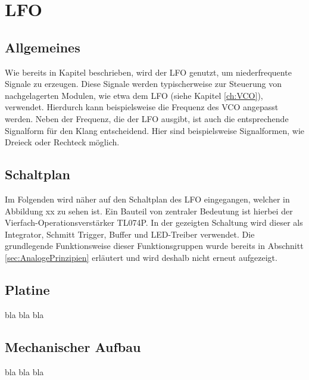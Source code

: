 \chapter{LFO}
\label{ch:LFO}

\section{Allgemeines}
Wie bereits in Kapitel \label{ch:concept} beschrieben, wird der LFO genutzt, um niederfrequente Signale zu erzeugen. 
Diese Signale werden typischerweise zur Steuerung von nachgelagerten Modulen, wie etwa dem LFO (siehe Kapitel \ref{ch:VCO}), verwendet.
Hierdurch kann beispielsweise die Frequenz des VCO angepasst werden. 
Neben der Frequenz, die der LFO ausgibt, ist auch die entsprechende Signalform für den Klang entscheidend. Hier sind beispielsweise Signalformen, wie Dreieck oder Rechteck möglich.

\section{Schaltplan}
Im Folgenden wird näher auf den Schaltplan des LFO eingegangen, welcher in Abbildung xx zu sehen ist. 
Ein Bauteil von zentraler Bedeutung ist hierbei der Vierfach-Operationsverstärker TL074P. In der gezeigten Schaltung wird dieser als Integrator, Schmitt Trigger, Buffer und LED-Treiber verwendet.
Die grundlegende Funktionsweise dieser Funktionsgruppen wurde bereits in Abschnitt \ref{sec:AnalogePrinzipien} erläutert und wird deshalb nicht erneut aufgezeigt.
 

\section{Platine}
bla bla bla

\section{Mechanischer Aufbau}
bla bla bla